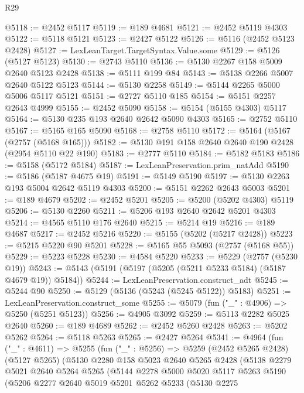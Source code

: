 \begin{lexlean}{R29}
\begin{coremodule}
@5118 := @2452 @5117
@5119 := @189 @4681
@5121 := @2452 @5119 @4303
@5122 := @5118 @5121
@5123 := @2427 @5122
@5126 := @5116 (@2452 @5123 @2428)
@5127 := LexLeanTarget.TargetSyntax.Value.some
@5129 := @5126 (@5127 @5123)
@5130 := @2743 @5110
@5136 := @5130 @2267 @158 @5009 @2640 @5123 @2428
@5138 := @5111 @199 @84
@5143 := @5138 @2266 @5007 @2640 @5122 @5123
@5144 := @5130 @2258
@5149 := @5144 @2265 @5000 @5006 @5117 @5121
@5151 := @2727 @5110 @185
@5154 := @5151 @2257 @2643 @4999
@5155 := @2452 @5090
@5158 := @5154 (@5155 @4303) @5117
@5164 := @5130 @235 @193 @2640 @2642 @5090 @4303
@5165 := @2752 @5110
@5167 := @5165 @165 @5090
@5168 := @2758 @5110
@5172 := @5164 (@5167 (@2757 (@5168 @165)))
@5182 := @5130 @191 @158 @2640 @2640 @190 @2428 (@2954 @5110 @22 @190)
@5183 := @2777 @5110
@5184 := @5182 @5183
@5186 := @5158 (@5172 @5184)
@5187 := LexLeanPreservation.prim_natAdd
@5190 := @5186 (@5187 @4675 @19)
@5191 := @5149 @5190
@5197 := @5130 @2263 @193 @5004 @2642 @5119 @4303
@5200 := @5151 @2262 @2643 @5003
@5201 := @189 @4679
@5202 := @2452 @5201
@5205 := @5200 (@5202 @4303) @5119
@5206 := @5130 @2260
@5211 := @5206 @193 @2640 @2642 @5201 @4303
@5214 := @4565 @5110 @176 @2640
@5215 := @5214 @19
@5216 := @189 @4687
@5217 := @2452 @5216
@5220 := @5155 (@5202 (@5217 @2428))
@5223 := @5215 @5220 @90 @5201
@5228 := @5165 @55 @5093 (@2757 (@5168 @55))
@5229 := @5223 @5228
@5230 := @4584 @5220
@5233 := @5229 (@2757 (@5230 @19))
@5243 := @5143 (@5191 (@5197 (@5205 (@5211 @5233 @5184) (@5187 @4679 @19)) @5184))
@5244 := LexLeanPreservation.construct_adt
@5245 := @5244 @90
@5250 := @5129 (@5136 (@5243 (@5245 @5122)) @5183)
@5251 := LexLeanPreservation.construct_some
@5255 := @5079 (fun ("_" : @4906) => @5250 (@5251 @5123))
@5256 := @4905 @3092
@5259 := @5113 @2282 @5025 @2640
@5260 := @189 @4689
@5262 := @2452 @5260 @2428
@5263 := @5202 @5262
@5264 := @5118 @5263
@5265 := @2427 @5264
@5341 := @4964
    (fun ("_" : @4611) =>
    @5255
      (fun ("_" : @5256) =>
      @5259
        (@2452 @5265 @2428)
        (@5127 @5265)
        (@5130
          @2280
          @158
          @5023
          @2640
          @5265
          @2428
          (@5138
            @2279
            @5021
            @2640
            @5264
            @5265
            (@5144
              @2278
              @5000
              @5020
              @5117
              @5263
              @5190
              (@5206
                @2277
                @2640
                @5019
                @5201
                @5262
                @5233
                (@5130
                  @2275

\end{coremodule}
\end{lexlean}
